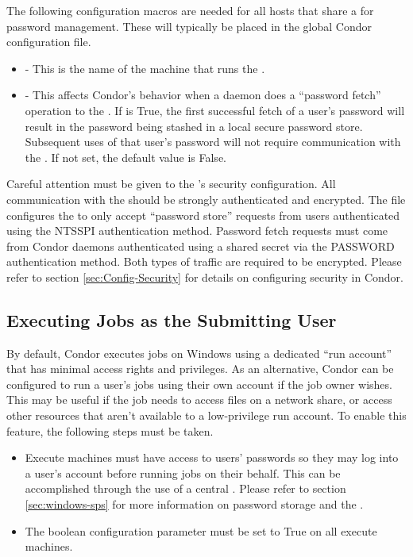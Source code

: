 The following configuration macros are needed for all hosts that share
a  for password management.  These will typically be
placed in the global Condor configuration file.
\begin{itemize}
\item {} - This is the name of the machine that runs
      the .
\item {} - This affects Condor's behavior
      when a daemon does a ``password fetch'' operation to the
      . If  is True, the
      first successful fetch of a user's password will result in the
      password being stashed in a local secure password
      store. Subsequent uses of that user's password will not require
      communication with the .  If not set, the default
      value is False.
\end{itemize}

Careful attention must be given to the 's security
configuration.  All communication with the  should be
strongly authenticated and encrypted.  The
 file configures the 
to only accept ``password store'' requests from users authenticated
using the NTSSPI authentication method.  Password fetch requests must
come from Condor daemons authenticated using a shared secret via the
PASSWORD authentication method.  Both types of traffic are required to
be encrypted.  Please refer to section \ref{sec:Config-Security} for
details on configuring security in Condor.

\subsection{\label{sec:windows-run-as-owner}Executing Jobs as the Submitting User}

By default, Condor executes jobs on Windows using a dedicated ``run
account'' that has minimal access rights and privileges.  As an
alternative, Condor can be configured to run a user's jobs using their
own account if the job owner wishes. This may be useful if the job
needs to access files on a network share, or access other resources
that aren't available to a low-privilege run account. To enable this
feature, the following steps must be taken.

\begin{itemize}
\item Execute machines must have access to users' passwords so they
      may log into a user's account before running jobs on their
      behalf.  This can be accomplished through the use of a central
      . Please refer to section \ref{sec:windows-sps}
      for more information on password storage and the .
\item The boolean configuration parameter
       must be set to True on all
      execute machines.
\end{itemize}


